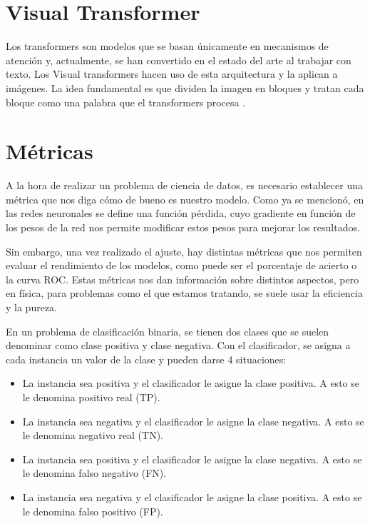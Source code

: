 \documentclass[a4paper,12pt,oneside,titlepage]{book}
\begin{document}
\section*{Visual Transformer}

Los transformers \cite{transformers} son modelos que se basan únicamente en mecanismos de atención y, actualmente, se han convertido en el estado del arte al trabajar con texto. Los Visual transformers hacen uso de esta arquitectura y la aplican a imágenes. La idea fundamental es que dividen la imagen en bloques y tratan cada bloque como una palabra que el transformers procesa \cite{vit}.

\section{Métricas}

A la hora de realizar un problema de ciencia de datos, es necesario establecer una métrica que nos diga cómo de bueno es nuestro modelo. Como ya se mencionó, en las redes neuronales se define una función pérdida, cuyo gradiente en función de los pesos de la red nos permite modificar estos pesos para mejorar los resultados.
 
Sin embargo, una vez realizado el ajuste, hay distintas métricas que nos permiten evaluar el rendimiento de los modelos, como puede ser el porcentaje de acierto o la curva ROC. Estas métricas nos dan información sobre distintos aspectos, pero en física, para problemas como el que estamos tratando, se suele usar la eficiencia y la pureza.
 
En un problema de clasificación binaria, se tienen dos clases que se suelen denominar como clase positiva y clase negativa. Con el clasificador, se asigna a cada instancia un valor de la clase y pueden darse 4 situaciones:

\begin{itemize}
  \item La instancia sea positiva y el clasificador le asigne la clase positiva. A esto se le denomina positivo real (TP).
  \item La instancia sea negativa y el clasificador le asigne la clase negativa. A esto se le denomina negativo real (TN).
  \item La instancia sea positiva y el clasificador le asigne la clase negativa. A esto se le denomina falso negativo (FN).
  \item La instancia sea negativa y el clasificador le asigne la clase positiva. A esto se le denomina falso positivo (FP).
\end{itemize} 
\end{document}
